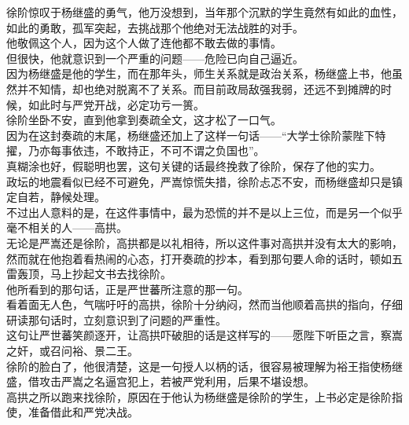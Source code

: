 \begin{multicols}{\theparacolNo}
徐阶惊叹于杨继盛的勇气，他万没想到，当年那个沉默的学生竟然有如此的血性，如此的勇敢，孤军突起，去挑战那个他绝对无法战胜的对手。\\

他敬佩这个人，因为这个人做了连他都不敢去做的事情。\\

但很快，他就意识到一个严重的问题——危险已向自己逼近。\\

因为杨继盛是他的学生，而在那年头，师生关系就是政治关系，杨继盛上书，他虽然并不知情，却也绝对脱离不了关系。而目前政局敌强我弱，还远不到摊牌的时候，如此时与严党开战，必定功亏一篑。\\

徐阶坐卧不安，直到他拿到奏疏全文，这才松了一口气。\\

因为在这封奏疏的末尾，杨继盛还加上了这样一句话——“大学士徐阶蒙陛下特擢，乃亦每事依违，不敢持正，不可不谓之负国也”。\\

真糊涂也好，假聪明也罢，这句关键的话最终挽救了徐阶，保存了他的实力。\\

政坛的地震看似已经不可避免，严嵩惊慌失措，徐阶忐忑不安，而杨继盛却只是镇定自若，静候处理。\\

不过出人意料的是，在这件事情中，最为恐慌的并不是以上三位，而是另一个似乎毫不相关的人——高拱。\\

无论是严嵩还是徐阶，高拱都是以礼相待，所以这件事对高拱并没有太大的影响，然而就在他抱着看热闹的心态，打开奏疏的抄本，看到那句要人命的话时，顿如五雷轰顶，马上抄起文书去找徐阶。\\

他所看到的那句话，正是严世蕃所注意的那一句。\\

看着面无人色，气喘吁吁的高拱，徐阶十分纳闷，然而当他顺着高拱的指向，仔细研读那句话时，立刻意识到了问题的严重性。\\

这句让严世蕃笑颜逐开，让高拱吓破胆的话是这样写的——愿陛下听臣之言，察嵩之奸，或召问裕、景二王。\\

徐阶的脸白了，他很清楚，这是一句授人以柄的话，很容易被理解为裕王指使杨继盛，借攻击严嵩之名逼宫犯上，若被严党利用，后果不堪设想。\\

高拱之所以跑来找徐阶，原因在于他认为杨继盛是徐阶的学生，上书必定是徐阶指使，准备借此和严党决战。\\


\end{multicols}
